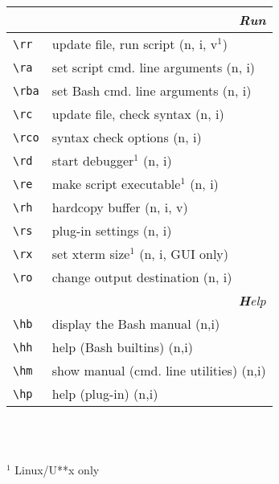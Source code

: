\documentclass[oneside,11pt,landscape,DIV16]{scrartcl}
\begin{document}
\begin{multicols}{3}
\begin{center}
\begin{tabular}[]{|p{11mm}|p{62mm}|}
\hline
\hline
\multicolumn{2}{|r|}{\textsl{\textbf{R}un}} \\[1.0ex]
\hline \verb'\rr'  & update file, run script           \hfill (n, i, v$^1$)\\
\hline \verb'\ra'  & set script cmd. line arguments    \hfill (n, i)\\
\hline \verb'\rba' & set Bash cmd. line arguments      \hfill (n, i)\\
\hline \verb'\rc'  & update file, check syntax         \hfill (n, i)\\
\hline \verb'\rco' & syntax check options              \hfill (n, i)\\
\hline \verb'\rd'  & start debugger$^1$                \hfill (n, i)\\
\hline \verb'\re'  & make script executable$^1$        \hfill (n, i)\\
\hline \verb'\rh'  & hardcopy buffer                   \hfill (n, i, v)\\
\hline \verb'\rs'  & plug-in settings                  \hfill (n, i)\\
\hline \verb'\rx'  & set xterm size$^1$                \hfill (n, i, GUI only)\\
\hline \verb'\ro'  & change output destination         \hfill (n, i)\\
\hline
\hline 
\multicolumn{2}{|r|}{\textsl{\textbf{H}elp}}\\[1.0ex]
\hline \verb'\hb'   & display the Bash manual           \hfill (n,i)\\
\hline \verb'\hh'   & help (Bash builtins)              \hfill (n,i)\\
\hline \verb'\hm'   & show manual (cmd. line utilities) \hfill (n,i)\\
\hline \verb'\hp'   & help (plug-in)                    \hfill (n,i)\\
\hline 
\end{tabular}\\
%
\vfill
%
\begin{minipage}[b]{75mm}%
\scriptsize{%
\vspace{10mm}
\hrulefill\\
$^1$ {Linux/U**x only}
}%
\end{minipage}\\
%
%
\end{center}%
\end{multicols}%
%
\end{document}
